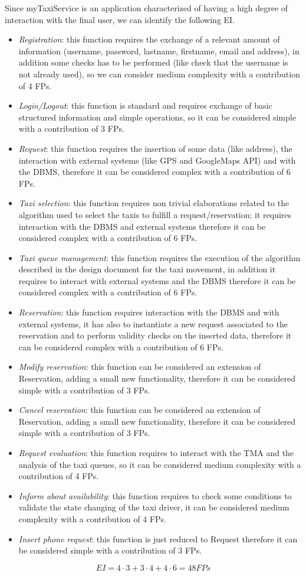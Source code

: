 Since myTaxiService is an application characterized of having a high
degree of interaction with the final user, we can identify the following
EI.
\begin{itemize}
\item \emph{Registration}: this function requires the exchange of a relevant
amount of information (username, password, lastname, firstname, email
and address), in addition some checks has to be performed (like check
that the username is not already used), so we can consider medium
complexity with a contribution of 4 FPs.
\item \emph{Login/Logout}: this function is standard and requires exchange
of basic structured information and simple operations, so it can be
considered simple with a contribution of 3 FPs.
\item \emph{Request}: this function requires the insertion of some data
(like address), the interaction with external systems (like GPS and
GoogleMaps API) and with the DBMS, therefore it can be considered
complex with a contribution of 6 FPs.
\item \emph{Taxi selection}: this function requires non trivial elaborations
related to the algorithm used to select the taxis to fulfill a request/reservation;
it requires interaction with the DBMS and external systems therefore
it can be considered complex with a contribution of 6 FPs.
\item \emph{Taxi queue management}: this function requires the execution
of the algorithm described in the design document for the taxi movement,
in addition it requires to interact with external systems and the
DBMS therefore it can be considered complex with a contribution of
6 FPs.
\item \emph{Reservation}: this function requires interaction with the DBMS
and with external systems, it has also to instantiate a new request
associated to the reservation and to perform validity checks on the
inserted data, therefore it can be considered complex with a contribution
of 6 FPs.
\item \emph{Modify reservation}: this function can be considered an extension
of Reservation, adding a small new functionality, therefore it can
be considered simple with a contribution of 3 FPs.
\item \emph{Cancel reservation}: this function can be considered an extension
of Reservation, adding a small new functionality, therefore it can
be considered simple with a contribution of 3 FPs.
\item \emph{Request evaluation}: this function requires to interact with
the TMA and the analysis of the taxi queues, so it can be considered
medium complexity with a contribution of 4 FPs.
\item \emph{Inform about availability}: this function requires to check
some conditions to validate the state changing of the taxi driver,
it can be considered medium complexity with a contribution of 4 FPs.
\item \emph{Insert phone request}: this function is just reduced to Request
therefore it can be considered simple with a contribution of 3 FPs.
\end{itemize}
\[
EI=4\cdot3+3\cdot4+4\cdot6=48FPs
\]



